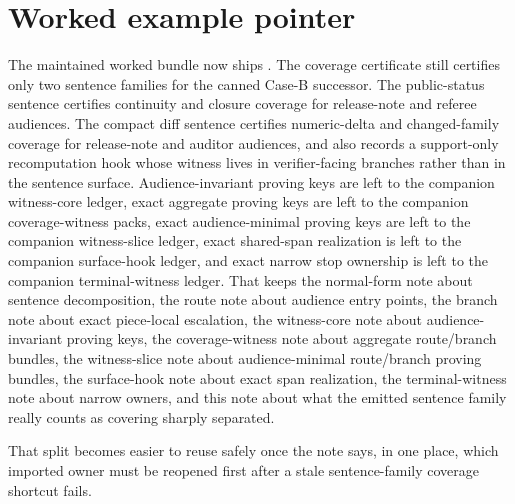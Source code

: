 \documentclass[11pt]{article}
\begin{document}
\section{Worked example pointer}
The maintained worked bundle now ships .\cite{series:workedexample}
The coverage certificate still certifies only two sentence families for the canned Case-B successor.
The public-status sentence certifies continuity and closure coverage for release-note and referee audiences.
The compact diff sentence certifies numeric-delta and changed-family coverage for release-note and auditor audiences, and also records a support-only recomputation hook whose witness lives in verifier-facing branches rather than in the sentence surface.
Audience-invariant proving keys are left to the companion witness-core ledger, exact aggregate proving keys are left to the companion coverage-witness packs, exact audience-minimal proving keys are left to the companion witness-slice ledger, exact shared-span realization is left to the companion surface-hook ledger, and exact narrow stop ownership is left to the companion terminal-witness ledger.
That keeps the normal-form note about sentence decomposition, the route note about audience entry points, the branch note about exact piece-local escalation, the witness-core note about audience-invariant proving keys, the coverage-witness note about aggregate route/branch bundles, the witness-slice note about audience-minimal route/branch proving bundles, the surface-hook note about exact span realization, the terminal-witness note about narrow owners, and this note about what the emitted sentence family really counts as covering sharply separated.\cite{series:downstreamnormalforms,series:challengeroutes,series:challengebranches,series:challengecoveragewitnesscores,series:challengecoveragewitnesspacks,series:challengecoveragewitnessslices,series:challengesurfacehooks,series:challengeterminalwitnesses}


\noindent That split becomes easier to reuse safely once the note says, in one place, which imported owner must be reopened first after a stale sentence-family coverage shortcut fails.
\end{document}
